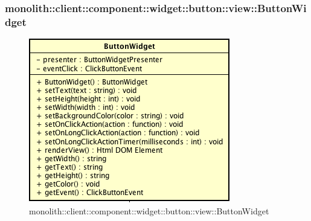 \subsubsection{monolith::client::component::widget::button::view::ButtonWidget}

\label{monolith::client::component::widget::button::view::ButtonWidget}
\begin{figure}[H]
	\centering
	\includegraphics[scale=0.5]{Sezioni/SottosezioniST/img/ButtonWidget.png}
	\caption{monolith::client::component::widget::button::view::ButtonWidget}
\end{figure}


